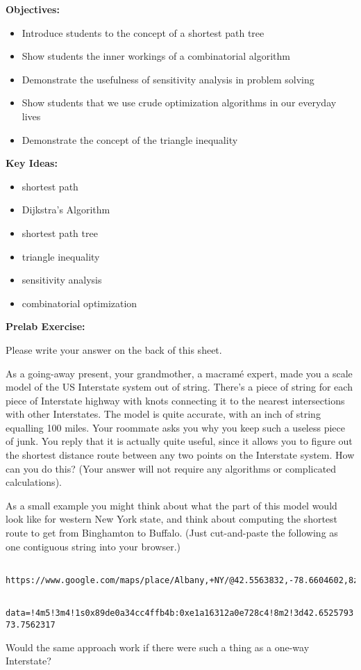 \documentclass[twoside]{article}%
\begin{document}

\noindent
{\bf Objectives:}
\begin{itemize}
\item   Introduce students to the concept of a shortest path tree
\item   Show students the inner workings of a combinatorial algorithm
\item   Demonstrate the usefulness of sensitivity analysis in problem solving
\item   Show students that we use crude optimization algorithms in our
        everyday lives
\item   Demonstrate the concept of the triangle inequality
\end{itemize}

\noindent
{\bf Key Ideas:}
\begin{itemize}
\item   shortest path
\item   Dijkstra's Algorithm
\item   shortest path tree
\item   triangle inequality
\item   sensitivity analysis
\item   combinatorial optimization
\end{itemize}

\noindent
{\bf Prelab Exercise:}

Please write your answer on the back of this sheet.

\smallskip

As a going-away present, your grandmother, a macram\'e expert,
made you a scale model of the US Interstate system out of string.
There's a piece of string for each piece of Interstate highway
with knots connecting it to the nearest intersections with other
Interstates.  The model is quite accurate, with an inch of string
equalling 100 miles.  Your roommate
asks you why
you keep such a useless piece of junk.  You reply that it is
actually quite useful, since it allows you to figure out the
shortest distance route between any two points on the Interstate
system.  How can you do this?  (Your answer will not require any
algorithms or complicated calculations).

\noindent
As a small example you might think about what the part of this model would look like for western New York state, and think about computing the shortest route to get from Binghamton to Buffalo. (Just cut-and-paste the following as one contiguous string into your browser.)

\noindent
\begin{verbatim}
    https://www.google.com/maps/place/Albany,+NY/@42.5563832,-78.6604602,8z/
\end{verbatim}
\begin{verbatim}
    data=!4m5!3m4!1s0x89de0a34cc4ffb4b:0xe1a16312a0e728c4!8m2!3d42.6525793!4d-73.7562317
\end{verbatim}


\smallskip
\noindent
Would the same approach work if there were such a thing as a
one-way Interstate?
\end{document}
